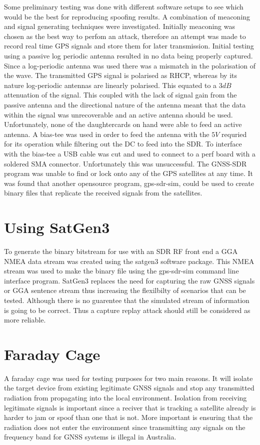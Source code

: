 Some preliminary testing was done with different software setups to see which would be the best for reproducing spoofing results. A combination of meaconing and signal
generating techniques were investigated. Initially meaconing was chosen as the best way to perfom an attack, therefore an attempt was made to record real time GPS signals
and store them for later transmission. Initial testing using a passive log periodic antenna resulted in no data being properly captured. Since a log-periodic antenna was
used there was a mismatch in the polarisation of the wave. The transmitted GPS signal is polarised as RHCP, whereas by its nature log-periodic antennas are linearly
polarised. This equated to a $3dB$ attenuation of the signal. This coupled with the lack of signal gain from the passive antenna and the directional nature of the antenna
meant that the data within the signal was unrecoverable and an active antenna should be used. Unfortunately, none of the daughtercards on hand were able to feed an active
antenna. A bias-tee was used in order to feed the antenna with the $5V$ requried for its operation while filtering out the DC to feed into the SDR. To interface with the
bias-tee a USB cable was cut and used to connect to a perf board with a soldered SMA connector. Unfortunately this was unsuccessful. The GNSS-SDR program was unable to
find or lock onto any of the GPS satellites at any time. It was found that another opensource program, gps-sdr-sim, could be used to create binary files that replicate
the received signals from the satellites. 

\section{Using SatGen3}

To generate the binary bitstream for use with an SDR RF front end a GGA NMEA data stream was created using the satgen3 software package. This NMEA stream was used to make
the binary file using the gps-sdr-sim command line interface program. SatGen3 replaces the need for capturing the raw GNSS signals or GGA sentence stream thus increasing
the flexilbilty of scenarios that can be tested. Although there is no guarentee that the simulated stream of information is going to be correct. Thus a capture replay
attack should still be considered as more reliable.

\section{Faraday Cage}
A faraday cage was used for testing purposes for two main reasons. It will isolate the target device from existing legitimate GNSS signals and stop any transmitted
radiation from propagating into the local environment. Isolation from receiving legitimate signals is important since a reciver that is tracking a satellite already is
harder to jam or spoof than one that is not. More important is ensuring that the radiation does not enter the environment since transmitting any signals on the frequency
band for GNSS systems is illegal in Australia. 

